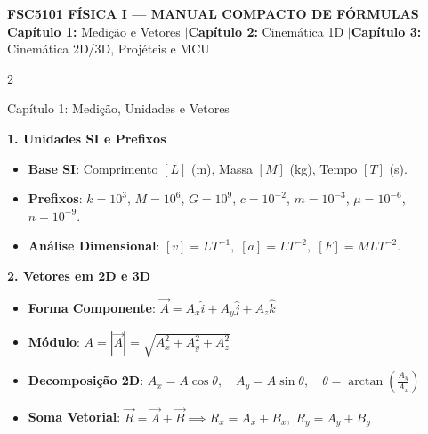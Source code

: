 \documentclass[9pt,a4paper]{article}
\begin{document}
\begin{center}
    \begin{tcolorbox}[coltext=white,halign=center]
        {\Large \bfseries FSC5101 FÍSICA I --- MANUAL COMPACTO DE FÓRMULAS}\\[2pt]
        {\small \textbf{Capítulo 1:} Medição e Vetores \quad$\vert$\quad \textbf{Capítulo 2:} Cinemática 1D \quad$\vert$\quad \textbf{Capítulo 3:} Cinemática 2D/3D, Projéteis e MCU}
    \end{tcolorbox}
\end{center}

\vspace{-6pt}

\begin{multicols*}{2}

\begin{topicbox}{Capítulo 1: Medição, Unidades e Vetores}

\textbf{1. Unidades SI e Prefixos}
\begin{itemize}[leftmargin=*,itemsep=0pt]
    \item \textbf{Base SI}: Comprimento $[L]$ (m), Massa $[M]$ (kg), Tempo $[T]$ (s).
    \item \textbf{Prefixos}: $k=10^3$, $M=10^6$, $G=10^9$, $c=10^{-2}$, $m=10^{-3}$, $\mu=10^{-6}$, $n=10^{-9}$.
    \item \textbf{Análise Dimensional}: $[v] = LT^{-1}, \; [a] = LT^{-2}, \; [F] = MLT^{-2}$.
\end{itemize}

\textbf{2. Vetores em 2D e 3D}
\begin{itemize}[leftmargin=*,itemsep=0pt]
    \item \textbf{Forma Componente}: $\vec{A} = A_x \hat{i} + A_y \hat{j} + A_z \hat{k}$
    \item \textbf{Módulo}: $A = |\vec{A}| = \sqrt{A_x^2 + A_y^2 + A_z^2}$
    \item \textbf{Decomposição 2D}: $A_x = A \cos\theta, \quad A_y = A \sin\theta, \quad \theta = \arctan\left(\frac{A_y}{A_x}\right)$
    \item \textbf{Soma Vetorial}: $\vec{R} = \vec{A} + \vec{B} \implies R_x = A_x + B_x, \; R_y = A_y + B_y$
\end{itemize}


\end{topicbox}
\end{multicols*}
\end{document}

